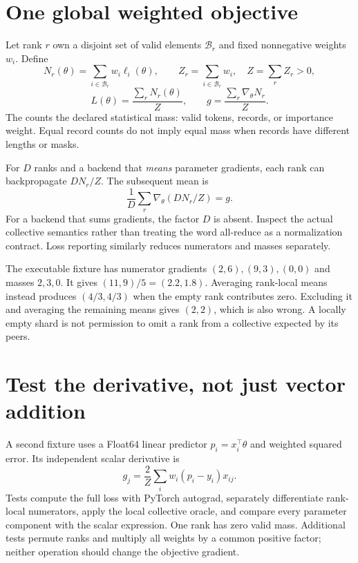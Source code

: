 \section{One global weighted objective}
Let rank $r$ own a disjoint set of valid elements $\mathcal B_r$ and fixed
nonnegative weights $w_i$. Define
\[
N_r(\theta)=\sum_{i\in\mathcal B_r}w_i\ell_i(\theta),\qquad
Z_r=\sum_{i\in\mathcal B_r}w_i,\quad Z=\sum_rZ_r>0,
\]
\[
L(\theta)=\frac{\sum_rN_r(\theta)}{Z},\qquad
g=\frac{\sum_r\nabla_\theta N_r}{Z}.
\]
The  counts the declared statistical mass: valid tokens, records,
or importance weight. Equal record counts do not imply equal mass when records
have different lengths or masks.

For $D$ ranks and a backend that \emph{means} parameter gradients,
each rank can backpropagate $D N_r/Z$. The subsequent mean is
\[
\frac1D\sum_r\nabla_\theta(DN_r/Z)=g.
\]
For a backend that sums gradients, the factor $D$ is absent. Inspect the actual
collective semantics rather than treating the word all-reduce as a normalization
contract. Loss reporting similarly reduces numerators and masses separately.

The executable fixture has numerator gradients $(2,6),(9,3),(0,0)$ and masses
$2,3,0$. It gives $(11,9)/5=(2.2,1.8)$.
Averaging rank-local means instead produces $(4/3,4/3)$ when the empty rank
contributes zero. Excluding it and averaging the remaining means gives $(2,2)$,
which is also wrong. A locally empty shard is not permission to omit a rank from
a collective expected by its peers.

\section{Test the derivative, not just vector addition}
A second fixture uses a Float64 linear predictor $p_i=x_i^\top\theta$ and weighted
squared error. Its independent scalar derivative is
\[
g_j=\frac{2}{Z}\sum_iw_i(p_i-y_i)x_{ij}.
\]
Tests compute the full loss with PyTorch autograd, separately differentiate
rank-local numerators, apply the local collective oracle, and compare every
parameter component with the scalar expression. One rank has zero valid mass.
Additional tests permute ranks and multiply all weights by a common positive
factor; neither operation should change the objective gradient.

